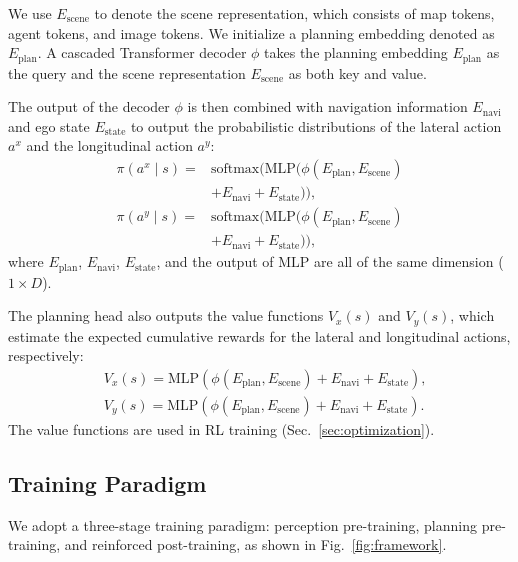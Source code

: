 We use $E_\text{scene}$ to denote the scene representation, which consists of map tokens, agent tokens, and image tokens. We initialize a planning embedding denoted as $E_\text{plan}$. A cascaded Transformer decoder $\phi$ takes the planning embedding $E_\text{plan}$ as the query and the scene representation $E_\text{scene}$ as both key and value.

The output of the decoder $\phi$ is then combined with navigation information $E_\text{navi}$ and ego state $E_\text{state}$ to output the probabilistic distributions of the lateral action $a^x$ and the longitudinal action $a^y$:
\begin{equation}
\begin{aligned}
     \pi(a^x\mid s) = & \text{softmax}(\text{MLP}(\phi(E_\text{plan}, E_\text{scene}) \\
    & + E_\text{navi} + E_\text{state})), \\
     \pi(a^y\mid s) = & \text{softmax}(\text{MLP}(\phi(E_\text{plan}, E_\text{scene}) \\
     & + E_\text{navi} + E_\text{state})),
\label{eq:action distribution}
\end{aligned}
\end{equation}
where $E_\text{plan}$, $E_\text{navi}$, $E_\text{state}$, and the output of $\text{MLP}$ are all of the same dimension ($1 \times D$).

The planning head also outputs the value functions $V_x(s)$ and $V_y(s)$, which estimate the expected cumulative rewards for the lateral and longitudinal actions, respectively: 
\begin{equation}
\begin{aligned}
    & V_x(s) = \text{MLP}(\phi(E_\text{plan}, E_\text{scene}) + E_\text{navi} + E_\text{state}), \\
    & V_y(s) = \text{MLP}(\phi(E_\text{plan}, E_\text{scene}) + E_\text{navi} + E_\text{state}).
\end{aligned}
\end{equation}
The value functions are used in RL training (Sec.~\ref{sec:optimization}).

\subsection{Training Paradigm}
We adopt a three-stage training paradigm: perception pre-training, planning pre-training, and reinforced post-training, as shown in Fig.~\ref{fig:framework}.

